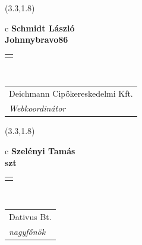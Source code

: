 \documentclass[11pt]{article}
\begin{document}
\makebox(3.3,1.8){
  \renewcommand\arraystretch{1.3}
  \begin{tabular}[c]{c}
    \hspace{8.5mm}
    \LARGE\bf{ Schmidt László }\\
    \hspace{8.5mm}
    \Large{ Johnnybravo86 }\\
    \renewcommand\arraystretch{3}
    \begin{tabular}[c]{c}
      \centering
      \fontfamily{phv}\selectfont{
        \textbf{
          \textsc{
            \scriptsize{
            \color{Dark}{ Ismerkedő }\color{Bright}{ Webmester }\color{Bright}{ Sminkmester }\color{Bright}{ Programozó }
            }
          }
        }
      }
    \end{tabular}
    \\
    \renewcommand\arraystretch{1}
    \begin{tabular}{p{3.3in}}
      \hspace{.7cm}Deichmann Cipőkereskedelmi Kft.\\
      \hspace{.7cm}\emph{ Webkoordinátor }\\
    \end{tabular}
  \end{tabular}
}

\makebox(3.3,1.8){
  \renewcommand\arraystretch{1.3}
  \begin{tabular}[c]{c}
    \hspace{8.5mm}
    \LARGE\bf{ Szelényi Tamás }\\
    \hspace{8.5mm}
    \Large{ szt }\\
    \renewcommand\arraystretch{3}
    \begin{tabular}[c]{c}
      \centering
      \fontfamily{phv}\selectfont{
        \textbf{
          \textsc{
            \scriptsize{
            \color{Bright}{ Ismerkedő }\color{Dark}{ Webmester }\color{Bright}{ Sminkmester }\color{Bright}{ Programozó }
            }
          }
        }
      }
    \end{tabular}
    \\
    \renewcommand\arraystretch{1}
    \begin{tabular}{p{3.3in}}
      \hspace{.7cm}Dativus Bt.\\
      \hspace{.7cm}\emph{ nagyfőnök }\\
    \end{tabular}
  \end{tabular}
}
\end{document}
